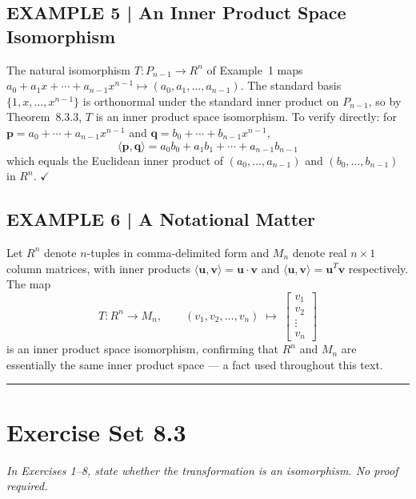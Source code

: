 \documentclass{article}
\begin{document}
\subsection*{EXAMPLE 5 | An Inner Product Space Isomorphism}

The natural isomorphism $T : P_{n-1} \to R^n$ of Example~1 maps
$a_0+a_1x+\cdots+a_{n-1}x^{n-1} \mapsto (a_0,a_1,\ldots,a_{n-1})$.
The standard basis $\{1,x,\ldots,x^{n-1}\}$ is orthonormal under the standard inner product
on $P_{n-1}$, so by Theorem~8.3.3, $T$ is an inner product space isomorphism. To verify
directly: for $\mathbf{p} = a_0+\cdots+a_{n-1}x^{n-1}$ and $\mathbf{q} = b_0+\cdots+b_{n-1}x^{n-1}$,
\[
  \langle\mathbf{p},\mathbf{q}\rangle = a_0 b_0 + a_1 b_1 + \cdots + a_{n-1}b_{n-1}
\]
which equals the Euclidean inner product of $(a_0,\ldots,a_{n-1})$ and $(b_0,\ldots,b_{n-1})$
in $R^n$. $\checkmark$

\subsection*{EXAMPLE 6 | A Notational Matter}

Let $R^n$ denote $n$-tuples in comma-delimited form and $M_n$ denote real $n\times 1$ column
matrices, with inner products $\langle\mathbf{u},\mathbf{v}\rangle = \mathbf{u}\cdot\mathbf{v}$
and $\langle\mathbf{u},\mathbf{v}\rangle = \mathbf{u}^T\mathbf{v}$ respectively. The map
\[
  T : R^n \to M_n, \qquad (v_1, v_2, \ldots, v_n) \;\longmapsto\;
  \begin{bmatrix}v_1\\v_2\\\vdots\\v_n\end{bmatrix}
\]
is an inner product space isomorphism, confirming that $R^n$ and $M_n$ are essentially the
same inner product space — a fact used throughout this text.

\vspace{3mm}
\noindent\rule{\linewidth}{0.5pt}

\section*{Exercise Set 8.3}

\noindent\textit{In Exercises 1--8, state whether the transformation is an isomorphism.
No proof required.}
\end{document}
